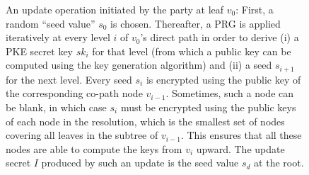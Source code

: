 \begin{figure}[ht!]
  \centering
  \caption[TreeKEM shared secret update.]{%
  \label{fig:CGKA-TreeKEM-Secrets}%
  An update operation initiated by the party at leaf \(v_0\): First, a random ``seed value'' \(s_0\) is chosen.
  Thereafter, a PRG is applied iteratively at every level \(i\) of \(v_0\)'s direct path in order to derive
  (i) a PKE secret key \(sk_i\) for that level (from which a public key can be computed using the key generation algorithm) and
  (ii) a seed \(s_{i+1}\) for the next level.
  Every seed \(s_i\) is encrypted using the public key of the corresponding co-path node \(v_{i-1}\).
  Sometimes, such a node can be blank, in which case \(s_i\) must be encrypted using the public keys of each node in the resolution, which is the smallest set of nodes covering all leaves in the subtree of \(v_{i-1}\).
  This ensures that all these nodes are able to compute the keys from \(v_i\) upward.
  The update secret \(I\) produced by such an update is the seed value \(s_d\) at the root.
  }%
  {}
\end{figure}

